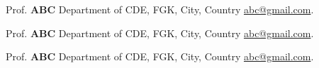 Prof. \textbf{ABC} Department of CDE, FGK, City, Country \href{mailto:abc@gmail.com}{{abc@gmail.com}}. 
\vspace*{7pt}

Prof. \textbf{ABC} Department of CDE, FGK, City, Country \href{mailto:abc@gmail.com}{{abc@gmail.com}}.
\vspace*{7pt}

Prof. \textbf{ABC} Department of CDE, FGK, City, Country \href{mailto:abc@gmail.com}{{abc@gmail.com}}.


